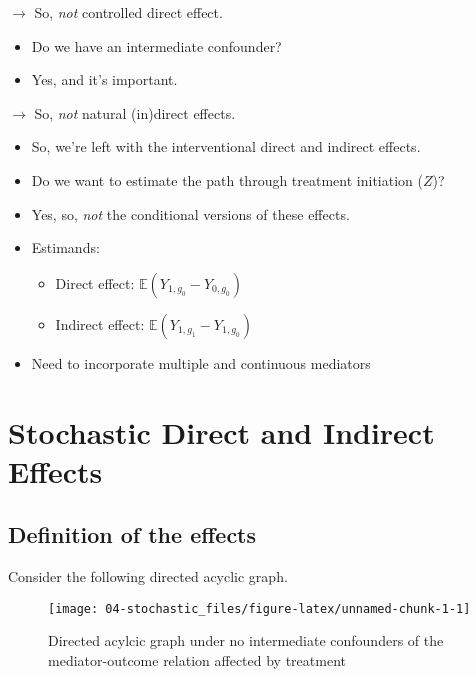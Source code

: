 \documentclass[
  12pt,
]{book}
\providecommand{\tightlist}{%
  \setlength{\itemsep}{0pt}\setlength{\parskip}{0pt}}
\theoremstyle{definition}
\theoremstyle{definition}
\theoremstyle{definition}
\newcommand{\E}{\mathbb{E}}
\newcommand{\1}{\mathbbm{1}}
\begin{document}
\(\rightarrow\) So, \emph{not} controlled direct effect.

\begin{itemize}
\tightlist
\item
  Do we have an intermediate confounder?
\item
  Yes, and it's important.
\end{itemize}

\(\rightarrow\) So, \emph{not} natural (in)direct effects.

\begin{itemize}
\tightlist
\item
  So, we're left with the interventional direct and indirect effects.
\item
  Do we want to estimate the path through treatment initiation (\(Z\))?
\item
  Yes, so, \emph{not} the conditional versions of these effects.
\item
  Estimands:

  \begin{itemize}
  \tightlist
  \item
    Direct effect: \(\E(Y_{1,g_0} - Y_{0,g_0})\)
  \item
    Indirect effect: \(\E(Y_{1,g_1} - Y_{1,g_0})\)
  \end{itemize}
\item
  Need to incorporate multiple and continuous mediators
\end{itemize}

\hypertarget{stochastic}{%
\chapter{Stochastic Direct and Indirect Effects}\label{stochastic}}

\hypertarget{definition-of-the-effects-1}{%
\section{Definition of the effects}\label{definition-of-the-effects-1}}

Consider the following directed acyclic graph.

\begin{figure}

{\centering \texttt{[image: 04-stochastic\_files/figure-latex/unnamed-chunk-1-1]} 

}

\caption{Directed acylcic graph under no intermediate confounders of the mediator-outcome relation affected by treatment}\label{fig:unnamed-chunk-1}
\end{figure}
\end{document}
